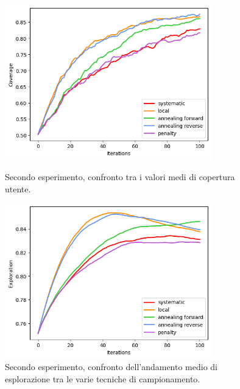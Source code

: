 \begin{figure}[p]
    \centering
    \includegraphics[width=0.8\textwidth]{img/ch4/experiment2/coverages_graphic_comparison.png}
    \caption[Grafici di copertura nel secondo esperimento]{Secondo esperimento, confronto tra i valori medi di copertura utente.}
    \label{fig:confronto_cov_exp2}

\vspace*{0.5cm}

    \includegraphics[width=0.8\textwidth]{img/ch4/experiment2/exploration_graphic_comparison.png}
    \caption[Grafici di esplorazione nel secondo esperimento]{Secondo esperimento, confronto dell'andamento medio di esplorazione tra le varie tecniche di campionamento.}
    \label{fig:confronto_expl_exp2}
\end{figure}

